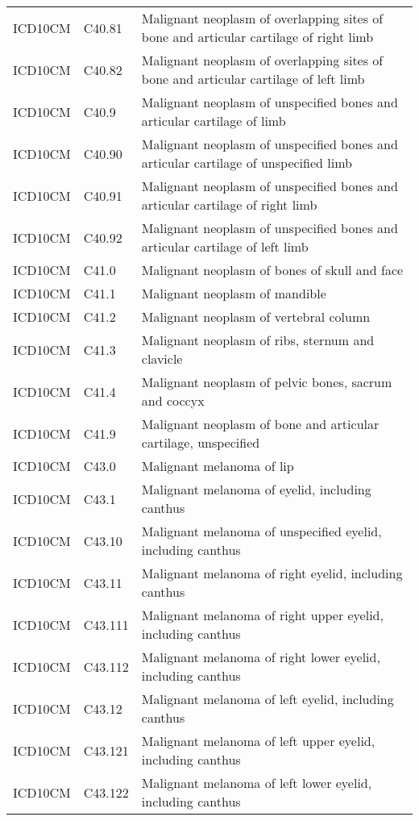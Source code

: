 \begin{longtable}{p{}p{}p{}}
  ICD10CM & C40.81 & Malignant neoplasm of overlapping sites of bone and articular cartilage of right limb \\ 
  ICD10CM & C40.82 & Malignant neoplasm of overlapping sites of bone and articular cartilage of left limb \\ 
  ICD10CM & C40.9 & Malignant neoplasm of unspecified bones and articular cartilage of limb \\ 
  ICD10CM & C40.90 & Malignant neoplasm of unspecified bones and articular cartilage of unspecified limb \\ 
  ICD10CM & C40.91 & Malignant neoplasm of unspecified bones and articular cartilage of right limb \\ 
  ICD10CM & C40.92 & Malignant neoplasm of unspecified bones and articular cartilage of left limb \\ 
  ICD10CM & C41.0 & Malignant neoplasm of bones of skull and face \\ 
  ICD10CM & C41.1 & Malignant neoplasm of mandible \\ 
  ICD10CM & C41.2 & Malignant neoplasm of vertebral column \\ 
  ICD10CM & C41.3 & Malignant neoplasm of ribs, sternum and clavicle \\ 
  ICD10CM & C41.4 & Malignant neoplasm of pelvic bones, sacrum and coccyx \\ 
  ICD10CM & C41.9 & Malignant neoplasm of bone and articular cartilage, unspecified \\ 
  ICD10CM & C43.0 & Malignant melanoma of lip \\ 
  ICD10CM & C43.1 & Malignant melanoma of eyelid, including canthus \\ 
  ICD10CM & C43.10 & Malignant melanoma of unspecified eyelid, including canthus \\ 
  ICD10CM & C43.11 & Malignant melanoma of right eyelid, including canthus \\ 
  ICD10CM & C43.111 & Malignant melanoma of right upper eyelid, including canthus \\ 
  ICD10CM & C43.112 & Malignant melanoma of right lower eyelid, including canthus \\ 
  ICD10CM & C43.12 & Malignant melanoma of left eyelid, including canthus \\ 
  ICD10CM & C43.121 & Malignant melanoma of left upper eyelid, including canthus \\ 
  ICD10CM & C43.122 & Malignant melanoma of left lower eyelid, including canthus \\ 

\end{longtable}

